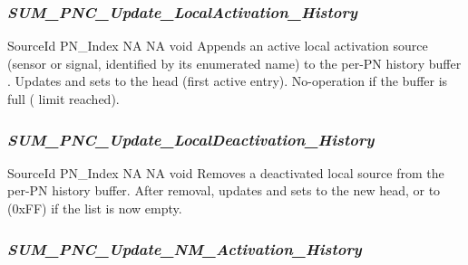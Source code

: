 {}

\subsubsection{\textit{SUM\_PNC\_Update\_LocalActivation\_History}}

{ \hspace*{1.5in} \vrule \hspace*{0.1in} SourceId \newline
  \hspace*{1.5in} \vrule \hspace*{0.1in} PN\_Index}
{NA}
{NA}
{void}
{Appends an active local activation source (sensor or signal, identified by its enumerated name) to the per-PN history buffer . Updates  and sets  to the head (first active entry). No-operation if the buffer is full ( limit reached).}

{}

\subsubsection{\textit{SUM\_PNC\_Update\_LocalDeactivation\_History}}

{ \hspace*{1.5in} \vrule \hspace*{0.1in} SourceId \newline
  \hspace*{1.5in} \vrule \hspace*{0.1in} PN\_Index}
{NA}
{NA}
{void}
{Removes a deactivated local source from the per-PN history buffer. After removal, updates  and sets  to the new head, or to  (0xFF) if the list is now empty.}

{}

\subsubsection{\textit{SUM\_PNC\_Update\_NM\_Activation\_History}}

